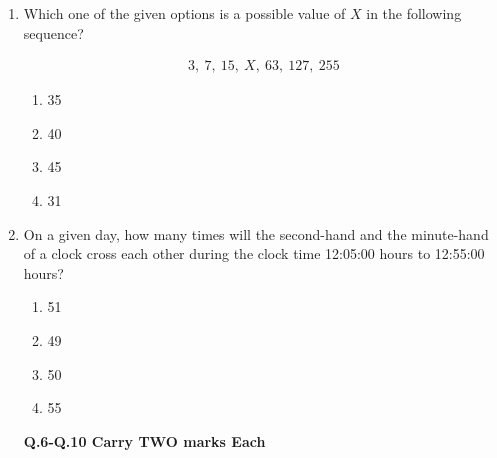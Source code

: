 \documentclass[a4paper,12pt]{exam}
\numberwithin{equation}{enumi}
\numberwithin{figure}{enumi}
\begin{document}
\begin{enumerate}
\hfill{}

\begin{multicols}{4}
\begin{enumerate}
\item $q^{p} = p^q$
\item $q^p = q^{2q}$
\item $\sqrt{q} = \sqrt{p}$
\item $\sqrt[p]{q} = \sqrt[q]{p}$
\end{enumerate}
\end{multicols}

\item Which  one of the given options is a possible value of $X$ in the following sequence?

\begin{align*}
3,\ 7,\ 15,\ X,\ 63,\ 127,\ 255
\end{align*}

\hfill{}

\begin{multicols}{4}
\begin{enumerate}
\item 35
\item 40
\item 45
\item 31
\end{enumerate}
\end{multicols}

\item On a given day, how many times  will the second-hand and the minute-hand of a  clock cross each other during the clock time 12:05:00 hours to 12:55:00 hours?

\hfill{}

\begin{multicols}{4}
\begin{enumerate}
\item 51
\item 49
\item 50
\item 55
\end{enumerate}
\end{multicols}

\textbf{Q.6-Q.10 Carry TWO marks Each}
\vspace{0.2cm}



\end{enumerate}
\end{document}
